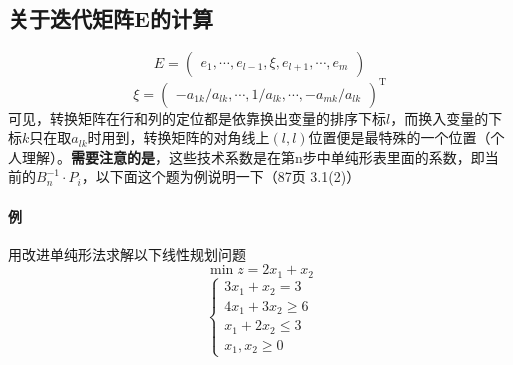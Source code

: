 \documentclass[]{report}
\begin{document}
		\subsection{关于迭代矩阵E的计算}
		\[E=\begin{pmatrix}
			e_1,\cdots,e_{l-1},\xi,e_{l+1},\cdots,e_m
		\end{pmatrix}\]
		\[\xi=\begin{pmatrix}
			-a_{1k}/a_{lk},\cdots,1/a_{lk},\cdots,-a_{mk}/a_{lk}
		\end{pmatrix}^{\mathrm{T}}\]
		可见，转换矩阵在行和列的定位都是依靠换出变量的排序下标$l$，而换入变量的下标$k$只在取$a_{lk}$时用到，转换矩阵的对角线上$(l,l)$位置便是最特殊的一个位置（个人理解）。\textbf{需要注意的是}，这些技术系数是在第n步中单纯形表里面的系数，即当前的$B_{n}^{-1}\cdot P_i$，以下面这个题为例说明一下（87页 3.1(2)）\par
		\paragraph{例} 用改进单纯形法求解以下线性规划问题\[\min z=2x_1+x_2\]\[\begin{cases}
			3x_1+x_2=3\\
			4x_1+3x_2\ge6\\
			x_1+2x_2\le3\\
			x_1,x_2\ge0
		\end{cases}\]
\end{document}

